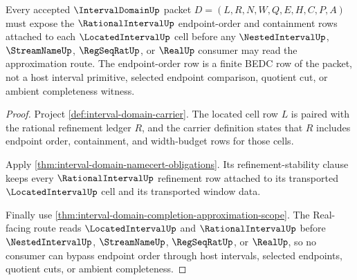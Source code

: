 \begin{theorem}
\label{thm:interval-domain-finite-endpoint-order}
Every accepted $\IntervalDomainUp$ packet $D=(L,R,N,W,Q,E,H,C,P,A)$ must expose the $\RationalIntervalUp$ endpoint-order and containment rows attached to each $\LocatedIntervalUp$ cell before any $\NestedIntervalUp$, $\StreamNameUp$, $\RegSeqRatUp$, or $\RealUp$ consumer may read the approximation route. The endpoint-order row is a finite BEDC row of the packet, not a host interval primitive, selected endpoint comparison, quotient cut, or ambient completeness witness.
\end{theorem}
\begin{proof}
Project \autoref{def:interval-domain-carrier}. The located cell row $L$ is paired with the rational refinement ledger $R$, and the carrier definition states that $R$ includes endpoint order, containment, and width-budget rows for those cells.

Apply \autoref{thm:interval-domain-namecert-obligations}. Its refinement-stability clause keeps every $\RationalIntervalUp$ refinement row attached to its transported $\LocatedIntervalUp$ cell and its transported window data.

Finally use \autoref{thm:interval-domain-completion-approximation-scope}. The Real-facing route reads $\LocatedIntervalUp$ and $\RationalIntervalUp$ before $\NestedIntervalUp$, $\StreamNameUp$, $\RegSeqRatUp$, or $\RealUp$, so no consumer can bypass endpoint order through host intervals, selected endpoints, quotient cuts, or ambient completeness.
\end{proof}


